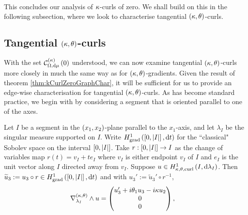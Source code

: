 This concludes our analysis of $\kappa$-curls of zero.
We shall build on this in the following subsection, where we look to characterise tangential $\left( \kappa, \theta \right)$-curls.

\subsection{Tangential $\left( \kappa, \theta \right)$-curls} \label{sec:ktCurlsTangential}
With the set $\mathcal{C}_{ \Omega, \mathrm{d}\mu}^{(\kappa)}\left( 0 \right)$ understood, we can now examine tangential $\left( \kappa, \theta \right)$-curls more closely in much the same way as for $\left( \kappa, \theta \right)$-gradients.
Given the result of theorem \ref{thm:kCurlZeroGraphChar}, it will be sufficient for us to provide an edge-wise characterisation for tangential $\left( \kappa, \theta \right)$-curls.
As has become standard practice, we begin with by considering a segment that is oriented parallel to one of the axes.
\begin{lemma} \label{lem:ktTanCurlSegmentParallel}
	Let $I$ be a segment in the $\left( x_1,x_2 \right)$-plane parallel to the $x_1$-axis, and let $\lambda_I$ be the singular measure supported on $I$.
	Write $H^1_\mathrm{grad}\left( \left[ 0,\left\lvert I \right\rvert \right], \mathrm{d}t \right)$ for the ``classical" Sobolev space on the interval $\left[ 0,\left\lvert I \right\rvert \right]$.
	Take $r:\left[ 0,\left\lvert I \right\rvert \right]\rightarrow I$ as the change of variables map $r(t) = v_I + te_I$ where $v_I$ is either endpoint $v_I$ of $I$ and $e_I$ is the unit vector along $I$ directed away from $v_I$.
	Suppose $u\in H^1_{\kappa,\theta,\mathrm{curl}}\left( I, \mathrm{d}\lambda_I \right)$.
	Then $\widetilde{u}_3 := u_3 \circ r \in H^1_\mathrm{grad}\left( \left[ 0,\left\lvert I \right\rvert \right], \mathrm{d}t \right)$ and with $u_3' := \widetilde{u}_3' \circ r^{-1}$,
	\begin{align*}
		\nabla_{\lambda_I}^{\left( \kappa, \theta \right)}\wedge u &= 
		\begin{pmatrix} u_3' + i\theta_1 u_3 - i\kappa u_2 \\ 0 \\ 0 \end{pmatrix},
	\end{align*}
\end{lemma}
